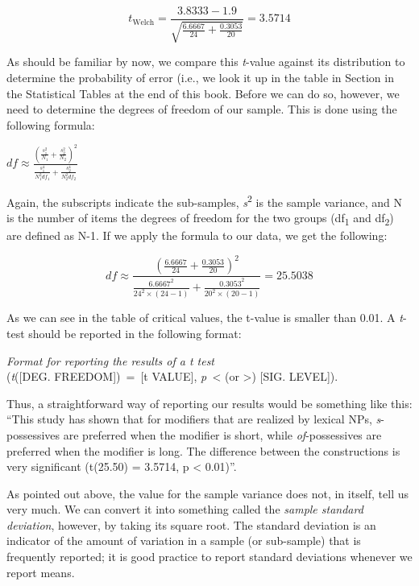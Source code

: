 $$t_{\text{Welch}} = \frac{3.8333 - 1.9}{\sqrt{\frac{6.6667}{24} + \frac{0.3053}{20}}} = 3.5714$$

As should be familiar by now, we compare this \textit{t}-value against its distribution to determine the probability of error (i.e., we look it up in the table in Section \label{sec:ttestcriticalvalues} in the Statistical Tables at the end of this book. Before we can do so, however, we need to determine the degrees of freedom of our sample. This is done using the following formula:

\begin{exe}
\ex $\displaystyle{df \approx \frac{\left(\frac{s_1^2}{N_1} + \frac{s_2^2}{N_2}\right)^2}{\frac{s_1^4}{N_1^2 df_1} + \frac{s_2^4}{N_2^2 df_2}}}$ 
\label{ex:formulawelchdf}
\end{exe}

Again, the subscripts indicate the sub-samples, \textit{s}\textsuperscript{2} is the sample variance, and N is the number of items the degrees of freedom for the two groups (df\textsubscript{1} and df\textsubscript{2}) are defined as N-1. If we apply the formula to our data, we get the following:

$$df \approx \frac{\left(\frac{6.6667}{24} + \frac{0.3053}{20}\right)^2}{\frac{6.6667^2}{24^2 \times  (24-1)} + \frac{0.3053^2}{20^2 \times  (20-1)}} = 25.5038$$

As we can see in the table of critical values, the t-value is smaller than 0.01. A \textit{t}-test should be reported in the following format:

\begin{exe}
\ex \textit{Format for reporting the results of a t test} \\
(\textit{t}([DEG. FREEDOM])~=~[t VALUE], \textit{p~}< (or >) [SIG. LEVEL]).
\label{ex:reportingwelchst}
\end{exe}

Thus, a straightforward way of reporting our results would be something like this: ``This study has shown that for modifiers that are realized by lexical NPs, \textit{s}-possessives are preferred when the modifier is short, while \textit{of}-possessives are preferred when the modifier is long. The difference between the constructions is very significant (t(25.50) = 3.5714, p < 0.01)''.

As pointed out above, the value for the sample variance does not, in itself, tell us very much. We can convert it into something called the \textit{sample standard deviation}, however, by taking its square root. The standard deviation is an indicator of the amount of variation in a sample (or sub-sample) that is frequently reported; it is good practice to report standard deviations whenever we report means.

